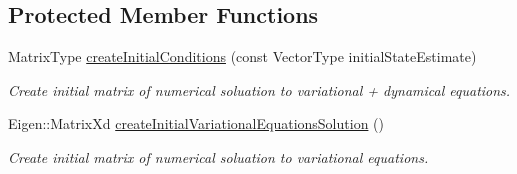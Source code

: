 \subsection*{Protected Member Functions}
\begin{DoxyCompactItemize}
\item 
Matrix\+Type \hyperlink{classtudat_1_1propagators_1_1VariationalEquationsSolver_a092e25fe320b08f16d262ff076eec174}{create\+Initial\+Conditions} (const Vector\+Type initial\+State\+Estimate)
\begin{DoxyCompactList}\small\item\em Create initial matrix of numerical soluation to variational + dynamical equations. \end{DoxyCompactList}\item 
Eigen\+::\+Matrix\+Xd \hyperlink{classtudat_1_1propagators_1_1VariationalEquationsSolver_a7926238714b28632fa31412c602deb32}{create\+Initial\+Variational\+Equations\+Solution} ()
\begin{DoxyCompactList}\small\item\em Create initial matrix of numerical soluation to variational equations. \end{DoxyCompactList}\end{DoxyCompactItemize}
